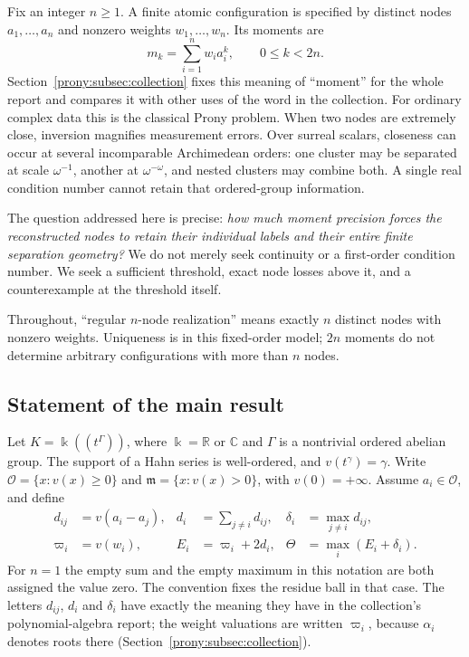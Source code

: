 \documentclass[11pt,letterpaper]{article}
\theoremstyle{definition}
\theoremstyle{remark}
\newcommand{\C}{\mathbb C}
\newcommand{\R}{\mathbb R}
\newcommand{\Ocal}{\mathcal O}
\newcommand{\mfr}{\mathfrak m}
\begin{document}
Fix an integer $n\ge1$. A finite atomic configuration is specified by distinct nodes $a_1,\ldots,a_n$
and nonzero weights $w_1,\ldots,w_n$. Its moments are
\begin{equation}\label{prony:eq:moments}
 m_k=\sum_{i=1}^n w_i a_i^k,\qquad 0\le k<2n.
\end{equation}
Section~\ref{prony:subsec:collection} fixes this meaning of ``moment'' for the
whole report and compares it with other uses of the word in the collection.
For ordinary complex data this is the classical Prony problem. When two
nodes are extremely close, inversion magnifies measurement errors. Over
surreal scalars, closeness can occur at several incomparable Archimedean
orders: one cluster may be separated at scale $\omega^{-1}$, another at
$\omega^{-\omega}$, and nested clusters may combine both. A single real
condition number cannot retain that ordered-group information.

The question addressed here is precise: \emph{how much moment precision
forces the reconstructed nodes to retain their individual labels and their
entire finite separation geometry?} We do not merely seek continuity or a
first-order condition number. We seek a sufficient threshold, exact node
losses above it, and a counterexample at the threshold itself.

Throughout, ``regular $n$-node realization'' means exactly $n$ distinct nodes
with nonzero weights. Uniqueness is in this fixed-order model; $2n$ moments
do not determine arbitrary configurations with more than $n$ nodes.

\subsection{Statement of the main result}
Let $K=\Bbbk((t^\Gamma))$, where $\Bbbk=\R$ or $\C$ and $\Gamma$ is a
nontrivial ordered abelian group. The support of a Hahn series is
well-ordered, and $v(t^\gamma)=\gamma$. Write
$\Ocal=\{x:v(x)\ge0\}$ and $\mfr=\{x:v(x)>0\}$, with $v(0)=+\infty$.
Assume $a_i\in\Ocal$, and define
\begin{equation}\label{prony:eq:geometry}
\begin{aligned}
 d_{ij}&=v(a_i-a_j),&
 d_i&=\sum_{j\ne i}d_{ij},& \delta_i&=\max_{j\ne i}d_{ij},\\
 \varpi_i&=v(w_i),& E_i&=\varpi_i+2d_i,&
 \Theta&=\max_i(E_i+\delta_i).
\end{aligned}
\end{equation}
For $n=1$ the empty sum and the empty maximum in this notation are both
assigned the value zero. The convention fixes the residue ball in that case.
The letters $d_{ij}$, $d_i$ and $\delta_i$ have exactly the meaning they have
in the collection's polynomial-algebra report; the weight valuations are
written $\varpi_i$, because $\alpha_i$ denotes roots there
(Section~\ref{prony:subsec:collection}).
\end{document}
